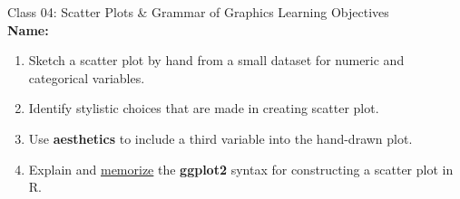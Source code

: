 \documentclass[11pt]{article}
\begin{document}
{\Large \textcolor{oiB}{
Class 04: Scatter Plots \& Grammar of Graphics
\hfill Learning Objectives}} \\

\textbf{Name:} \underline{\hspace{6cm}} \\

\vspace{0.2cm}

\begin{enumerate}
\renewcommand\labelenumi{\textcolor{light}{\textbf{LO \theenumi.}}}

\item Sketch a scatter plot by hand from a small dataset for numeric and
categorical variables.

\item Identify stylistic choices that are made in creating scatter plot. 

\item Use \textbf{aesthetics} to include a third variable into the hand-drawn
plot.

\item Explain and \underline{memorize} the \textbf{ggplot2} syntax for
constructing a scatter plot in R.

\end{enumerate}

\noindent\makebox[\linewidth]{\rule{1.1\textwidth}{0.4pt}}
\end{document}
